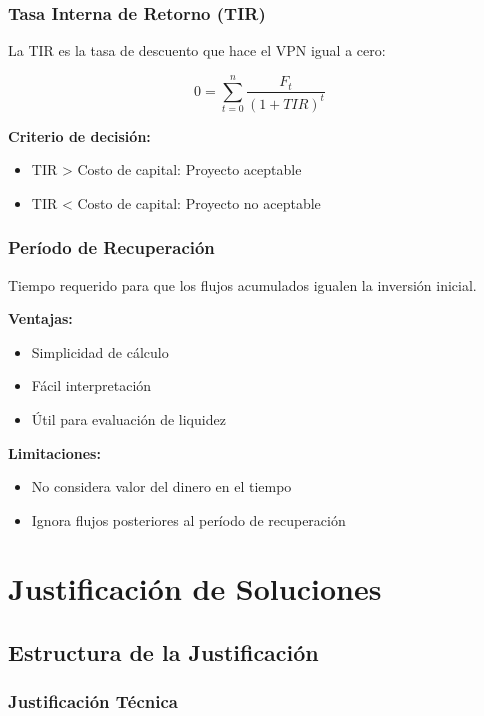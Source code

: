 \documentclass[12pt,letterpaper,oneside]{book}
\begin{document}
\subsubsection{Tasa Interna de Retorno (TIR)}

La TIR es la tasa de descuento que hace el VPN igual a cero:

\begin{equation}
0 = \sum_{t=0}^{n} \frac{F_t}{(1+TIR)^t}
\end{equation}

\textbf{Criterio de decisión:}
\begin{itemize}
\item TIR > Costo de capital: Proyecto aceptable
\item TIR < Costo de capital: Proyecto no aceptable
\end{itemize}

\subsubsection{Período de Recuperación}

Tiempo requerido para que los flujos acumulados igualen la inversión inicial.

\textbf{Ventajas:}
\begin{itemize}
\item Simplicidad de cálculo
\item Fácil interpretación
\item Útil para evaluación de liquidez
\end{itemize}

\textbf{Limitaciones:}
\begin{itemize}
\item No considera valor del dinero en el tiempo
\item Ignora flujos posteriores al período de recuperación
\end{itemize}

\section{Justificación de Soluciones}

\subsection{Estructura de la Justificación}

\subsubsection{Justificación Técnica}
\end{document}
